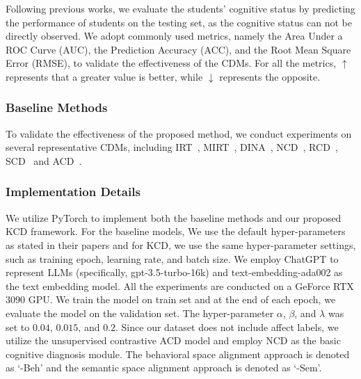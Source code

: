 Following previous works, we evaluate the students' cognitive status by predicting the performance of students on the testing set, as the cognitive status can not be directly observed. We adopt commonly used metrics, namely the Area Under a ROC Curve (AUC), the Prediction Accuracy (ACC), and the Root Mean Square Error (RMSE), to validate the effectiveness of the CDMs.
For all the metrics, $\uparrow$ represents that a greater value is better, while $\downarrow$ represents the opposite.

\subsubsection{Baseline Methods}

To validate the effectiveness of the proposed method, we conduct experiments on several representative CDMs, including IRT~\cite{lord1952theory}, MIRT~\cite{reckase200618}, DINA~\cite{de2009dina}, NCD~\cite{wang2020neural}, RCD~\cite{gao2021rcd}, SCD~\cite{wang2023self} and ACD~\cite{wang2024boosting}.
 

\subsubsection{Implementation Details}

We utilize PyTorch to implement both the baseline methods and our proposed KCD framework. 
For the baseline models, We use the default hyper-parameters as stated in their papers and for KCD, we use the same hyper-parameter settings, such as training epoch, learning rate, and batch size.
We employ ChatGPT to represent LLMs (specifically, gpt-3.5-turbo-16k) and text-embedding-ada002 as the text embedding model. All the experiments are conducted on a GeForce RTX 3090 GPU.
We train the model on train set and at the end of each epoch, we evaluate the model on the validation set.
The hyper-parameter $\alpha$, $\beta$, and $\lambda$ was set to $0.04$, $0.015$, and $0.2$.
Since our dataset does not include affect labels, we utilize the unsupervised contrastive ACD model and employ NCD as the basic cognitive diagnosis module.
The behavioral space alignment approach is denoted as `-Beh' and the semantic space alignment approach is denoted as `-Sem'.

